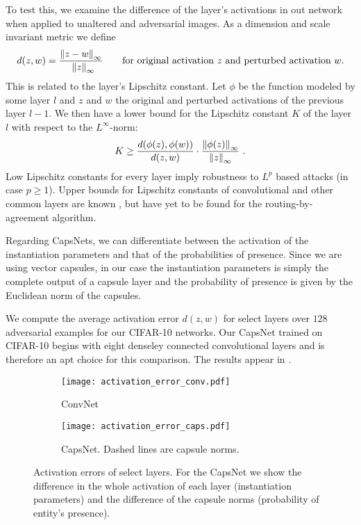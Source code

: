 To test this, we examine the difference of the layer's activations in out network when applied to unaltered and adversarial images. As a dimension and scale invariant metric we define
\begin{equation}
	d(z, w) = \frac{\norm[\infty]{z - w}}{\enspace \norm[\infty]{z}}
	\qquad \text{for original activation $z$ and perturbed activation $w$.}
\end{equation}
This is related to the layer's Lipschitz constant.
Let $\phi$ be the function modeled by some layer $l$ and $z$ and $w$ the original and perturbed activations of the previous layer $l-1$.
We then have a lower bound for the Lipschitz constant $K$ of the layer $l$ with respect to the $L^{\infty}$-norm:
\begin{equation}
K \geq \frac{d(\phi(z), \phi(w))}{d(z, w)} \cdot \frac{\norm[\infty]{\phi(z)}}{\norm[\infty]{z}}
\text{ .}
\end{equation}
Low Lipschitz constants for every layer imply robustness to $L^p$ based attacks (in case $p \geq 1$).
Upper bounds for Lipschitz constants of convolutional and other common layers are known \citep{intriguing},
but have yet to be found for the routing-by-agreement algorithm.

Regarding CapsNets, we can differentiate between the activation of the instantiation parameters and that of the probabilities of presence.
Since we are using vector capsules, in our case the instantiation parameters is simply the complete output of a capsule layer and the probability of presence is given by the Euclidean norm of the capsules.

We compute the average activation error $d(z, w)$ for select layers over $128$ adversarial examples for our CIFAR-10 networks. Our CapsNet trained on CIFAR-10 begins with eight denseley connected convolutional layers and is therefore an apt choice for this comparison.
The results appear in .

\begin{figure}
	\centering
	
	\begin{subfigure}{.5\textwidth}
		\texttt{[image: activation\_error\_conv.pdf]}
		\caption{ConvNet}
	\end{subfigure}%
	\begin{subfigure}{.5\textwidth}
		\texttt{[image: activation\_error\_caps.pdf]}
		\caption{CapsNet. Dashed lines are capsule norms.}
	\end{subfigure}
	\caption[Activation errors]{Activation errors of select layers. For the CapsNet we show the difference in the whole activation of each layer (instantiation parameters) and the difference of the capsule norms (probability of entity's presence).}
	\label{fig:activation}
\end{figure}

